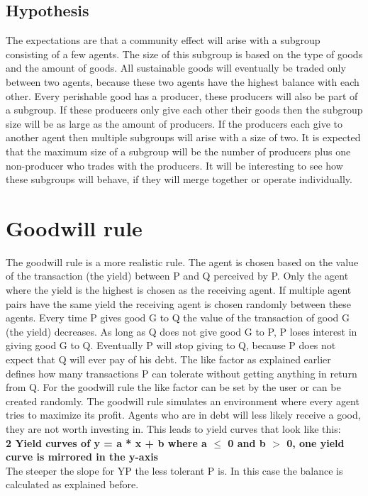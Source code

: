 \documentclass[twoside,openright]{uva-bachelor-thesis}
\begin{document}
\subsection{Hypothesis}
The expectations are that a community effect will arise with a subgroup consisting of a few agents. The size of this subgroup is based on the type of goods and the amount of goods. All sustainable goods will eventually be traded only between two agents, because these two agents have the highest balance with each other. Every perishable good has a producer, these producers will also be part of a subgroup. If these producers only give each other their goods then the subgroup size will be as large as the amount of producers. If the producers each give to another agent then multiple subgroups will arise with a size of two. It is expected that the maximum size of a subgroup will be the number of producers plus one non-producer who trades with the producers. It will be interesting to see how these subgroups will behave, if they will merge together or operate individually.

\section{Goodwill rule}
The goodwill rule is a more realistic rule. The agent is chosen based on the value of the transaction (the yield) between P and Q perceived by P. Only the agent where the yield is the highest is chosen as the receiving agent. If multiple agent pairs have the same yield the receiving agent is chosen randomly between these agents. Every time P gives good G to Q the value of the transaction of good G (the yield) decreases. As long as Q does not give good G to P, P loses interest in giving good G to Q. Eventually P will stop giving to Q, because P does not expect that Q will ever pay of his debt. The like factor as explained earlier defines how many transactions P can tolerate without getting anything in return from Q. For the goodwill rule the like factor can be set by the user or can be created randomly. The goodwill rule simulates an environment where every agent tries to maximize its profit. Agents who are in debt will less likely receive a good, they are not worth investing in.
This leads to yield curves that look like this: \\
\textbf{2 Yield curves of y = a * x + b where a $\le$ 0 and b $>$ 0, one yield curve is mirrored in the y-axis}\\
The steeper the slope for YP the less tolerant P is. In this case the balance is calculated as explained before.
\end{document}
